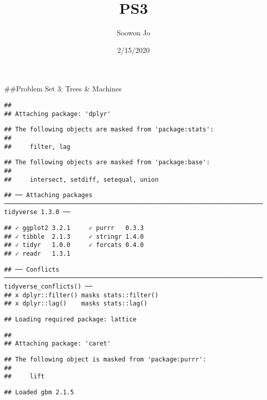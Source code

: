 \documentclass[]{article}
\title{PS3}
\author{Soowon Jo}
\date{2/15/2020}
\begin{document}
\maketitle

\#\#Problem Set 3: Trees \& Machines

\begin{verbatim}
## 
## Attaching package: 'dplyr'
\end{verbatim}

\begin{verbatim}
## The following objects are masked from 'package:stats':
## 
##     filter, lag
\end{verbatim}

\begin{verbatim}
## The following objects are masked from 'package:base':
## 
##     intersect, setdiff, setequal, union
\end{verbatim}

\begin{verbatim}
## ── Attaching packages ──────────────────────────────────────────────────────────────────────────────────────────── tidyverse 1.3.0 ──
\end{verbatim}

\begin{verbatim}
## ✓ ggplot2 3.2.1     ✓ purrr   0.3.3
## ✓ tibble  2.1.3     ✓ stringr 1.4.0
## ✓ tidyr   1.0.0     ✓ forcats 0.4.0
## ✓ readr   1.3.1
\end{verbatim}

\begin{verbatim}
## ── Conflicts ─────────────────────────────────────────────────────────────────────────────────────────────── tidyverse_conflicts() ──
## x dplyr::filter() masks stats::filter()
## x dplyr::lag()    masks stats::lag()
\end{verbatim}

\begin{verbatim}
## Loading required package: lattice
\end{verbatim}

\begin{verbatim}
## 
## Attaching package: 'caret'
\end{verbatim}

\begin{verbatim}
## The following object is masked from 'package:purrr':
## 
##     lift
\end{verbatim}

\begin{verbatim}
## Loaded gbm 2.1.5
\end{verbatim}
\end{document}
